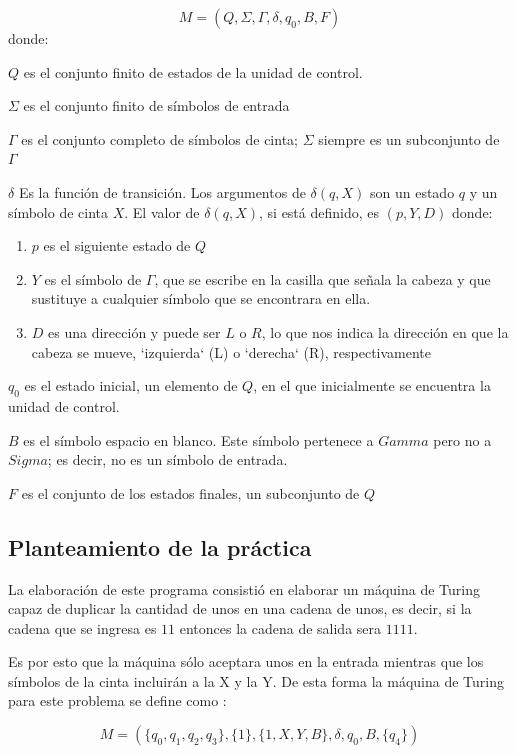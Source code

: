 \[ M=(Q, \Sigma, \Gamma, \delta, q_0, B, F) \]
donde:
\begin{description}
 \item $Q$ es el conjunto finito de estados de la unidad de control.
 \item $ \Sigma $ es el conjunto finito de símbolos de entrada
 \item $ \Gamma $ es el conjunto completo de símbolos de cinta; $ \Sigma $ siempre es un subconjunto de $\Gamma$
 \item $\delta$ Es la función de transición. Los argumentos de $\delta(q, X)$ son un estado $q$ y un símbolo de cinta $X$. El valor de $\delta(q, X)$, si está definido, es $(p, Y, D)$ donde:
 \begin{enumerate}
  \item $p$ es el siguiente estado de $Q$
  \item $Y$ es el símbolo de $\Gamma$, que se escribe en la casilla que señala la cabeza y que sustituye a cualquier símbolo que se encontrara en ella.
  \item $D$ es una dirección y puede ser $L$ o $ R$, lo que nos indica la dirección en que la cabeza se mueve, `izquierda` (L) o `derecha` (R), respectivamente
 \end{enumerate}
 \item $q_0$ es el estado inicial, un elemento de $Q$, en el que inicialmente se encuentra la unidad de control.
 \item $B$ es el símbolo espacio en blanco. Este símbolo pertenece a $Gamma$ pero no a $Sigma$; es decir, no es un símbolo de entrada.
 \item $F$ es el conjunto de los estados finales, un subconjunto de $Q$
\end{description}

\subsection{Planteamiento de la práctica}
La elaboración de este programa consistió en elaborar un máquina de Turing capaz de duplicar la cantidad de unos en una cadena de unos, es decir, si la cadena que se ingresa es $ 11 $ entonces la cadena de salida sera $ 1111 $.

Es por esto que la máquina sólo aceptara unos en la entrada mientras que los símbolos de la cinta incluirán a la X y la Y. De esta forma la máquina de Turing para este problema se define como \cite{LIBRO}:

\[M=(\lbrace q_{0}, q_{1}, q_{2}, q_{3}\rbrace, \lbrace 1 \rbrace, \lbrace 1, X, Y, B \rbrace, \delta, q_{0}, B, \lbrace q_{4} \rbrace)\]

